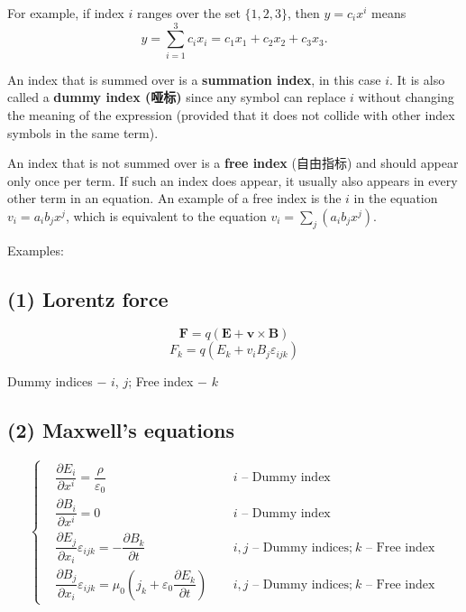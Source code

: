For example, if index \(i\) ranges over the set \(\{1, 2, 3\}\), then \(y = c_ix^i\) means \[y = \sum_{i=1}^3 c_ix_i = c_1x_1 + c_2x_2 + c_3x_3.\]

An index that is summed over is a \textbf{summation index}, in this case
\(i\). It is also called a \textbf{dummy index (哑标)} since any symbol can
replace \(i\) without changing the meaning of the expression (provided
that it does not collide with other index symbols in the same term).

An index that is not summed over is a \textbf{free index} (自由指标) and
should appear only once per term. If such an index does appear, it
usually also appears in every other term in an equation. An example of a
free index is the \(i\) in the equation \(v_i = a_i b_j x^j\), which is
equivalent to the equation \(v_i = \sum_j(a_i b_j x^j)\).

Examples:

\subsection*{(1) Lorentz force}\label{lorentz-force}

\[\boldsymbol F = q(\boldsymbol E + \boldsymbol v \times \boldsymbol B)\]
\[F_k = q (E_k + v_i B_j \varepsilon_{ijk})\]

Dummy indices \(-\) \(i\), \(j\); Free index \(-\) \(k\)

\subsection*{(2) Maxwell's equations}\label{maxwells-equations}

\[\left\{
    \begin{aligned}
        &\dfrac{\partial E_i}{\partial x^i} = \dfrac{\rho}{\varepsilon_0} & \ \ &  i \text{ -- Dummy index}\\
        &\dfrac{\partial B_i}{\partial x^i} = 0 && i \text{ -- Dummy index}\\
        &\dfrac{\partial E_j}{\partial x_i}\varepsilon_{ijk} = - \dfrac{\partial B_k}{\partial t} && i, j \text{ -- Dummy indices;} \ k \text{ -- Free index}\\
        &\dfrac{\partial B_j}{\partial x_i}\varepsilon_{ijk} = \mu_0\left( j_k + \varepsilon_0\dfrac{\partial E_k}{\partial t}\right) && i, j \text{ -- Dummy indices;} \ k \text{ -- Free index}
    \end{aligned}
\right.\]
